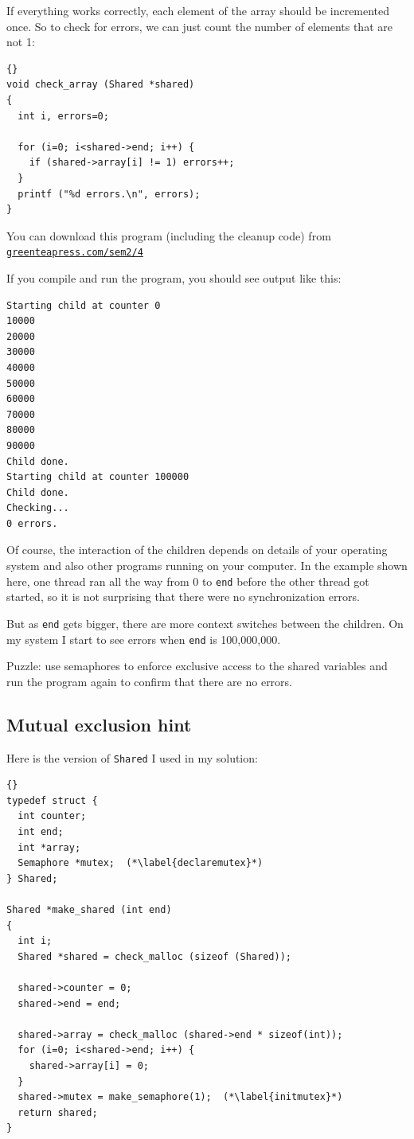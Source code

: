 \documentclass{book}
\newcommand{\shortlink}[1]{\href{https://greenteapress.com/sem2/#1}{\nolinkurl{greenteapress.com/sem2/#1}}}
\newcommand{\clearemptydoublepage}{\newpage\cleardoublepage}
\begin{document}
If everything works correctly, each element of the array should be
incremented once.  So to check for errors, we can just count the
number of elements that are not 1:

\begin{lstlisting}[title={}]{}
void check_array (Shared *shared)
{
  int i, errors=0;

  for (i=0; i<shared->end; i++) {
    if (shared->array[i] != 1) errors++;
  }
  printf ("%d errors.\n", errors);
}
\end{lstlisting}

You can download this program (including the cleanup code) from
\shortlink{4}

If you compile and run the program, you should see output like this:

\begin{verbatim}
Starting child at counter 0
10000
20000
30000
40000
50000
60000
70000
80000
90000
Child done.
Starting child at counter 100000
Child done.
Checking...
0 errors.
\end{verbatim}

Of course, the interaction of the children depends on details
of your operating system and also other programs running on your
computer.  In the example shown here, one thread ran all the way
from 0 to {\tt end} before the other thread got started, so it is
not surprising that there were no synchronization errors.

But as {\tt end} gets bigger, there are more context switches between
the children.  On my system I start to see errors when
{\tt end} is 100,000,000.

Puzzle: use semaphores to enforce exclusive access to the shared
variables and run the program again to confirm that there are
no errors.

\clearemptydoublepage
\subsection{Mutual exclusion hint}

Here is the version of {\tt Shared} I used in my solution:

\begin{lstlisting}[title={}]{}
typedef struct {
  int counter;
  int end;
  int *array;
  Semaphore *mutex;  (*\label{declaremutex}*)
} Shared;

Shared *make_shared (int end)
{
  int i;
  Shared *shared = check_malloc (sizeof (Shared));

  shared->counter = 0;
  shared->end = end;

  shared->array = check_malloc (shared->end * sizeof(int));
  for (i=0; i<shared->end; i++) {
    shared->array[i] = 0;
  }
  shared->mutex = make_semaphore(1);  (*\label{initmutex}*)
  return shared;
}
\end{lstlisting}
\end{document}
